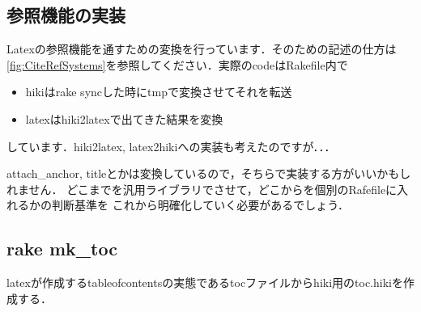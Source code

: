 \subsection{参照機能の実装}
Latexの参照機能を通すための変換を行っています．そのための記述の仕方は\ref{fig:CiteRefSystems}を参照してください．実際のcodeはRakefile内で

\begin{itemize}
\item hikiはrake syncした時にtmpで変換させてそれを転送
\item latexはhiki2latexで出てきた結果を変換
\end{itemize}
しています．hiki2latex, latex2hikiへの実装も考えたのですが．．．

attach\_anchor, titleとかは変換しているので，そちらで実装する方がいいかもしれません．
どこまでを汎用ライブラリでさせて，どこからを個別のRafefileに入れるかの判断基準を
これから明確化していく必要があるでしょう．

\subsection{rake mk\_toc}
latexが作成するtableofcontentsの実態であるtocファイルからhiki用のtoc.hikiを作成する．


